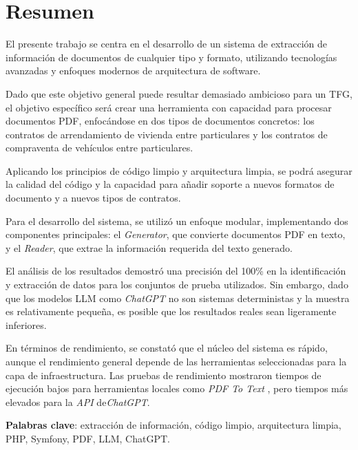 \newpage
\section*{Resumen}

El presente trabajo se centra en el desarrollo de un sistema de extracción de información de documentos de cualquier
tipo y formato, utilizando tecnologías avanzadas y enfoques modernos de arquitectura de software.

Dado que este objetivo general puede resultar demasiado ambicioso para un TFG, el objetivo específico será crear una
herramienta con capacidad para procesar documentos PDF, enfocándose en dos tipos de documentos concretos: los contratos
de arrendamiento de vivienda entre particulares y los contratos de compraventa de vehículos entre particulares.

Aplicando los principios de código limpio y arquitectura limpia, se podrá asegurar la calidad del
código y la capacidad para añadir soporte a nuevos formatos de documento y a nuevos tipos de contratos.

Para el desarrollo del sistema, se utilizó un enfoque modular, implementando dos componentes principales: el
\textit{Generator}, que convierte documentos PDF en texto, y el \textit{Reader}, que extrae la información requerida
del texto generado.

El análisis de los resultados demostró una precisión del 100\% en la identificación y extracción de datos para los
conjuntos de prueba utilizados.
Sin embargo, dado que los modelos LLM como \textit{ChatGPT} no son sistemas deterministas y la muestra es relativamente
pequeña, es posible que los resultados reales sean ligeramente inferiores.

En términos de rendimiento, se constató que el núcleo del sistema es rápido, aunque el rendimiento general depende de
las herramientas seleccionadas para la capa de infraestructura.
Las pruebas de rendimiento mostraron tiempos de ejecución bajos para herramientas locales como \textit{PDF To Text}
, pero
tiempos más elevados para la \textit{API} de\textit{ChatGPT}.


\vspace{1cm}

\textbf{Palabras clave}: extracción de información, código limpio, arquitectura limpia, PHP, Symfony, PDF, LLM, ChatGPT.